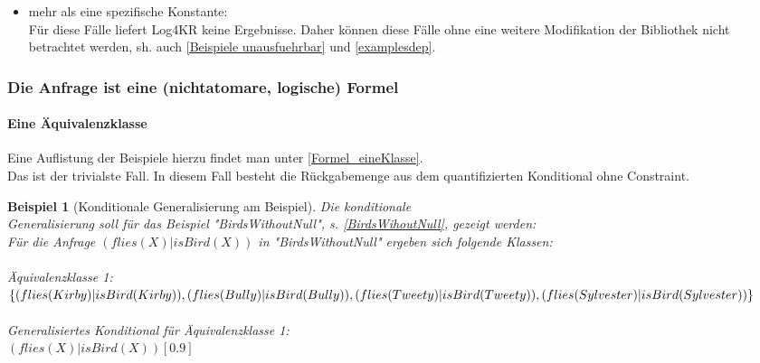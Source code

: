 \documentclass[draft]{scrreprt}
\newtheorem{Bsp}{Beispiel}[section]
\begin{document}
\begin{itemize}
\begin{itemize}
\begin{itemize}
			\item mehr als eine spezifische Konstante:\\
			Für diese Fälle liefert Log4KR  keine Ergebnisse. Daher können diese Fälle ohne eine weitere Modifikation der Bibliothek nicht betrachtet werden, sh. auch \ref{Beispiele unausfuehrbar} und \ref{examplesdep}.
		\end{itemize}
	\end{itemize}
\end{itemize}


\subsubsection{Die Anfrage ist eine (nichtatomare, logische) Formel} \label{KondGen_Formel}
\paragraph{Eine Äquivalenzklasse}
Eine Auflistung der Beispiele hierzu findet man unter \ref{Formel_eineKlasse}.\\
Das ist der trivialste Fall. In diesem Fall besteht die Rückgabemenge aus dem quantifizierten Konditional ohne Constraint.
	\begin{Bsp}[Konditionale Generalisierung am Beispiel]
	Die konditionale \\ Generalisierung soll für das Beispiel  "{}BirdsWithoutNull"{}, s. \ref{BirdsWihoutNull}, gezeigt werden:\\
	Für die Anfrage $ (flies(X) | isBird(X))$ in "{}BirdsWithoutNull"{} ergeben sich folgende Klassen:\\
	\\
	Äquivalenzklasse 1: $ \{(flies(Kirby) | isBird(Kirby)), (flies(Bully) | isBird(Bully)),\\ (flies(Tweety) | isBird(Tweety)), (flies(Sylvester) | isBird(Sylvester))\} $\\
	\\
	Generalisiertes Konditional für Äquivalenzklasse 1:\\ $ (flies(X) | isBird(X))[0.9]$
\end{Bsp}
\end{document}
